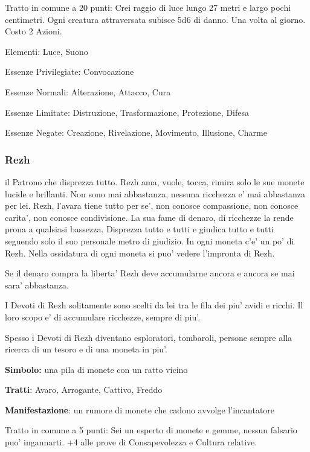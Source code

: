 \documentclass[a4paper,11pt,twoside,openany]{dndbook}
\begin{document}
{Tratto in comune a 20 punti: Crei raggio di luce lungo 27 metri e largo pochi centimetri. Ogni creatura attraversata subisce 5d6 di danno. Una volta al giorno. Costo 2 Azioni.

\bigskip

Elementi: Luce, Suono

\bigskip

Essenze Privilegiate: Convocazione

Essenze Normali: Alterazione, Attacco, Cura

Essenze Limitate: Distruzione, Trasformazione, Protezione, Difesa

Essenze Negate: Creazione, Rivelazione, Movimento, Illusione, Charme

\subsubsection{Rezh}

\label{rezh}

il Patrono che disprezza tutto. Rezh ama, vuole, tocca, rimira solo le sue monete lucide e brillanti. Non sono mai abbastanza, nessuna ricchezza e' mai abbastanza per lei. Rezh, l'avara tiene tutto per se', non conosce compassione, non conosce carita', non conosce condivisione. La sua fame di denaro, di ricchezze la rende prona a qualsiasi bassezza. Disprezza tutto e tutti e giudica tutto e tutti seguendo solo il suo personale metro di giudizio. In ogni moneta c'e' un po' di Rezh. Nella ossidatura di ogni moneta si puo' vedere l'impronta di Rezh.

Se il denaro compra la liberta' Rezh deve accumularne ancora e ancora se mai sara' abbastanza.

I Devoti di Rezh solitamente sono scelti da lei tra le fila dei piu' avidi e ricchi. Il loro scopo e' di accumulare ricchezze, sempre di piu'.

Spesso i Devoti di Rezh diventano esploratori, tombaroli, persone sempre alla ricerca di un tesoro e di una moneta in piu'.

\textbf{Simbolo:} una pila di monete con un ratto vicino

\textbf{Tratti}: Avaro, Arrogante, Cattivo, Freddo

\textbf{Manifestazione}: un rumore di monete che cadono avvolge l'incantatore

\bigskip

Tratto in comune a 5 punti: Sei un esperto di monete e gemme, nessun falsario puo' ingannarti. +4 alle prove di Consapevolezza e Cultura relative.

}
\end{document}
